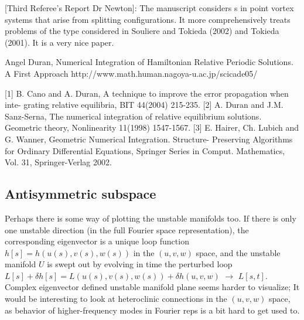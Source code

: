 [Third Referee's Report Dr Newton]:
The manuscript considers {\rpo s} in point vortex systems that
arise from splitting {\reqv} configurations. It more
comprehensively treats problems of the type considered in
Souliere and Tokieda (2002) and Tokieda (2001). It is a very
nice paper.

Angel Duran, Numerical Integration of Hamiltonian Relative
Periodic Solutions. A First Approach
http://www.math.human.nagoya-u.ac.jp/scicade05/

    [1] B. Cano and A. Duran, A technique to improve the error propagation when inte-
grating relative equilibria, BIT 44(2004) 215-235.
    [2] A. Duran and J.M. Sanz-Serna, The numerical integration of relative equilibrium
solutions. Geometric theory, Nonlinearity 11(1998) 1547-1567.
    [3] E. Hairer, Ch. Lubich and G. Wanner, Geometric Numerical Integration. Structure-
Preserving Algorithms for Ordinary Differential Equations, Springer Series in Comput.
Mathematics, Vol. 31, Springer-Verlag 2002.
	\\


\subsection{Antisymmetric subspace}


Perhaps there is some way of plotting the unstable manifolds too. If
there is only one unstable direction (in the full Fourier space
representation), the corresponding eigenvector is a unique loop function
$h[s] =  h(u(s),v(s),w(s))$ in the $(u,v,w)$ space, and the unstable manifold
$U$ is swept out by evolving in time the perturbed loop
$L[s] + \delta h[s] =  L(u(s),v(s),w(s)) + \delta h(u,v,w)$
$\to$ $L[s,t]$.
Complex eigenvector defined unstable manifold plane seems
harder to visualize;  It would be interesting
to look at heteroclinic connections in the $(u,v,w)$ space, as
behavior of higher-frequency modes in Fourier reps is a bit
hard to get used to.


